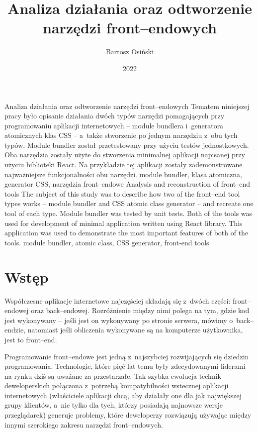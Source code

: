 \documentclass{SGGW-thesis}
\title{Analiza działania oraz odtworzenie narzędzi front--endowych}
\author{Bartosz Osiński}
\date{2022}
\begin{document}
\maketitle
\statementpage
\abstractpage
{Analiza działania oraz odtworzenie narzędzi front–endowych}
{Tematem niniejszej pracy było opisanie działania dwóch typów narzędzi pomagających przy programowaniu aplikacji internetowych -- module bundlera i~generatora atomicznych klas CSS -- a~także stworzenie po jednym narzędziu z~obu tych typów. Module bundler został przetestowany przy użyciu testów jednostkowych. Oba narzędzia zostały użyte do stworzenia minimalnej aplikacji napisanej przy użyciu biblioteki React. Na przykładzie tej aplikacji zostały zademonstrowane najważniejsze funkcjonalności obu narzędzi.}
{module bundler, klasa atomiczna, generator CSS, narzędzia front--endowe}
{Analysis and reconstruction of front--end tools}
{The subject of this study was to describe how two of the front--end tool types works -- module bundler and CSS atomic class generator -- and recreate one tool of each type. Module bundler was tested by unit tests. Both of the tools was used for development of minimal application written using React library. This application was used to demonstrate the most important features of both of the tools.}
{module bundler, atomic class, CSS generator, front-end tools}


\tableofcontents

\startchapterfromoddpage %


\chapter{Wstęp}
Współczesne aplikacje internetowe najczęściej składają się z~dwóch części: front--endowej oraz back--endowej. Rozróżnienie między nimi polega na tym, gdzie kod jest wykonywany -- jeśli jest on wykonywany po stronie serwera, mówimy o~back--endzie, natomiast jeśli obliczenia wykonywane są na komputerze użytkownika, jest to front--end.

Programowanie front--endowe jest jedną z~najszybciej rozwijających się dziedzin programowania. Technologie, które pięć lat temu były zdecydowanymi liderami na rynku dziś są uważane za przestarzałe. Tak szybka ewolucja technik deweloperskich połączona z~potrzebą kompatybilności wstecznej aplikacji internetowych (właściciele aplikacji chcą, aby działały one dla jak największej grupy klientów, a~nie tylko dla tych, którzy posiadają najnowsze wersje przeglądarek) generuje problemy, które deweloperzy rozwiązują używając między innymi szerokiego zakresu narzędzi front--endowych.
\end{document}

